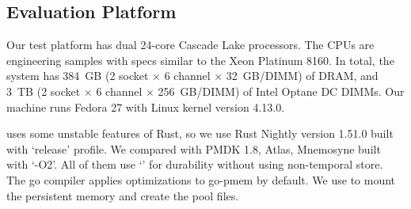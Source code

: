 



\subsection{Evaluation Platform}
\label{sec:res:platform}

Our test platform has dual 24-core Cascade Lake processors.  The CPUs are
engineering samples with specs similar to the Xeon Platinum 8160.  In total, the
system has 384~GB (2 socket × 6 channel × 32~GB/DIMM) of DRAM, and 3~TB (2
socket × 6 channel × 256~GB/DIMM) of Intel Optane DC DIMMs.  Our machine runs Fedora 27 with
Linux kernel version 4.13.0.

\This{} uses some unstable features of Rust, so we use Rust Nightly version
1.51.0 built with `release' profile.  We compared \this{} with PMDK 1.8, Atlas, Mnemosyne built
with `-O2'. All of them use `\clflushopt' for durability without using non-temporal store. The go compiler applies optimizations to go-pmem by default. We use \extfsDAX{} to mount the persistent memory and create the
pool files.

